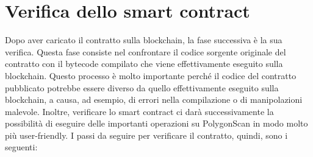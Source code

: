 \documentclass[12pt]{report}
\begin{document}
\section{Verifica dello smart contract}
Dopo aver caricato il contratto sulla blockchain, la fase successiva è la sua verifica.\newline
Questa fase consiste nel confrontare il codice sorgente originale del contratto con il bytecode compilato che viene effettivamente eseguito sulla blockchain.\newline
Questo processo è molto importante perché il codice del contratto pubblicato potrebbe essere diverso da quello effettivamente eseguito sulla blockchain, a causa, ad esempio, di errori nella compilazione o di manipolazioni malevole.\newline
Inoltre, verificare lo smart contract ci darà successivamente la possibilità di eseguire delle importanti operazioni su PolygonScan in modo molto più user-friendly.\newline
I passi da seguire per verificare il contratto, quindi, sono i seguenti:
\end{document}
